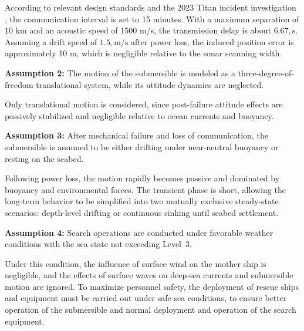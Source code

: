 \documentclass{mcmthesis}
\begin{document}
According to relevant design standards \cite{IMO2021Submersible} and 
the 2023 Titan incident investigation \cite{USCG2023Titan}, 
the communication interval is set to 15 minutes. With a maximum separation of 10 km and an acoustic speed of 1500 m/s, 
the transmission delay is about $6.67,\text{s}$. Assuming a drift speed of $1.5,\text{m/s}$ after power loss, the induced position error is approximately 10 m, which is negligible relative to the sonar scanning width.

\textbf{Assumption 2:}
The motion of the submersible is modeled as a three-degree-of-freedom translational system, while its attitude dynamics are neglected.

Only translational motion is considered, since post-failure attitude effects are passively stabilized and negligible relative to ocean currents and buoyancy.

\textbf{Assumption 3:}
After mechanical failure and loss of communication, the submersible is assumed to be either drifting under near-neutral buoyancy or resting on the seabed.

Following power loss, the motion rapidly becomes passive and dominated by buoyancy and environmental forces. The transient phase is short, allowing the long-term behavior to be simplified into two mutually exclusive steady-state scenarios: depth-level drifting or continuous sinking until seabed settlement.

\textbf{Assumption 4:}
Search operations are conducted under favorable weather conditions with the sea state not exceeding Level~3.

Under this condition, the influence of surface wind on the mother ship is negligible, and the effects of surface waves on deep-sea currents and submersible motion are ignored.
To maximize personnel safety,
the deployment of rescue ships and equipment must be carried out under safe sea conditions,
to ensure better operation of the submersible and normal deployment and operation of the search equipment.
\vspace{-0.1cm}
\end{document}
